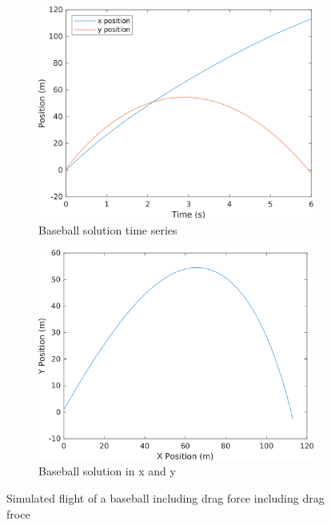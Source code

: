 \begin{figure}[h]
    \centering
    \begin{subfigure}{0.45\textwidth}
        \centering
        \includegraphics[width=\linewidth]{../code/chap12/baseball2_time.png}
        \caption{Baseball solution time series}
    \end{subfigure}
    \quad %
    \begin{subfigure}{0.45\textwidth}
        \centering
        \includegraphics[width=\linewidth]{../code/chap12/baseball2_xy.png}
        \caption{Baseball solution in x and y}
    \end{subfigure}
    \caption{Simulated flight of a baseball including drag force including drag froce}
    \label{f:baseball2}
\end{figure}

